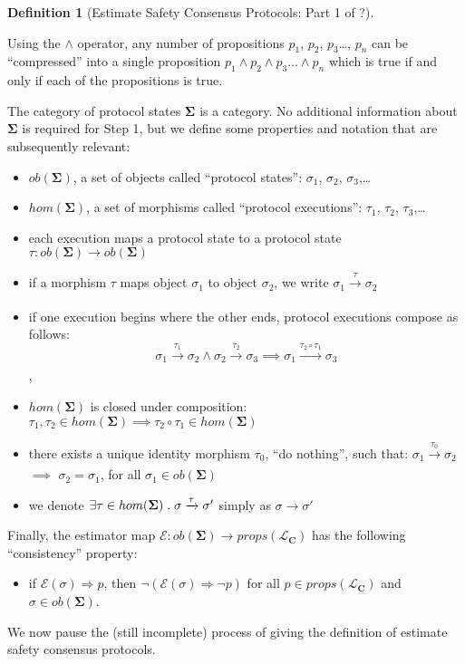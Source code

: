 \documentclass{article}
\theoremstyle{definition}
\newtheorem{defn}{Definition}[section]
\newcommand{\cat}{
	\mathbf
}
\begin{document}
\begin{defn}[Estimate Safety Consensus Protocols: Part 1 of ?]
\begin{description}
Using the $\land$ operator, any number of propositions $p_1$, $p_2$, $p_3$\ldots, $p_n$ can be ``compressed'' into a single proposition $p_1 \land p_2 \land p_3\ldots \land p_n$ which is true if and only if each of the propositions is true.

The category of protocol states $\cat{\Sigma}$ is a category. No additional information about $\cat{\Sigma}$ is required for Step 1, but we define some properties and notation that are subsequently relevant:

\begin{itemize}
\item $ob(\cat{\Sigma})$, a set of objects called ``protocol states'': $\sigma_1$, $\sigma_2$, $\sigma_3$,\ldots
\item $hom(\cat{\Sigma})$, a set of morphisms called ``protocol executions'': $\tau_1$, $\tau_2$, $\tau_3$,\ldots
\item each execution maps a protocol state to a protocol state $\tau:ob(\cat{\Sigma}) \to ob(\cat{\Sigma})$
\item if a morphism $\tau$ maps object $\sigma_1$ to object $\sigma_2$, we write $\sigma_1 \xrightarrow[]{\tau} \sigma_2$
\item if one execution begins where the other ends, protocol executions compose as follows:
$$\sigma_1 \xrightarrow[]{\tau_1} \sigma_2 \land \sigma_2 \xrightarrow[]{\tau_2} \sigma_3 \implies \sigma_1 \xrightarrow[]{\tau_2 \circ \tau_1} \sigma_3$$,
\item $hom(\cat{\Sigma})$ is closed under composition: $\tau_1, \tau_2 \in hom(\cat{\Sigma}) \implies \tau_2 \circ \tau_1 \in hom(\cat{\Sigma})$
\item there exists a unique identity morphism $\tau_0$, ``do nothing'', such that: $\sigma_1 \xrightarrow[]{\tau_0} \sigma_2$ $\implies$ $\sigma_2 = \sigma_1$, for all $\sigma_1 \in ob(\cat{\Sigma})$
\item we denote $\exists \tau \in hom(\cat{\Sigma}) \hspace{1mm} . \hspace{1mm} \sigma \xrightarrow[]{\tau} \sigma'$ simply as $\sigma \to \sigma'$
\end{itemize}


Finally, the estimator map $\mathcal{E}: ob(\cat{\Sigma}) \to props(\mathcal{L}_\cat{C})$ has the following ``consistency'' property:
\begin{itemize}
\item if $\mathcal{E}(\sigma) \Rightarrow p$, then $\neg{(\mathcal{E}(\sigma) \Rightarrow \neg p)}$ for all $p \in props(\mathcal{L}_\cat{C})$ and $\sigma \in ob(\cat{\Sigma})$.
\end{itemize}

We now pause the (still incomplete) process of giving the definition of estimate safety consensus protocols.
\end{description}
\end{defn}
\end{document}
